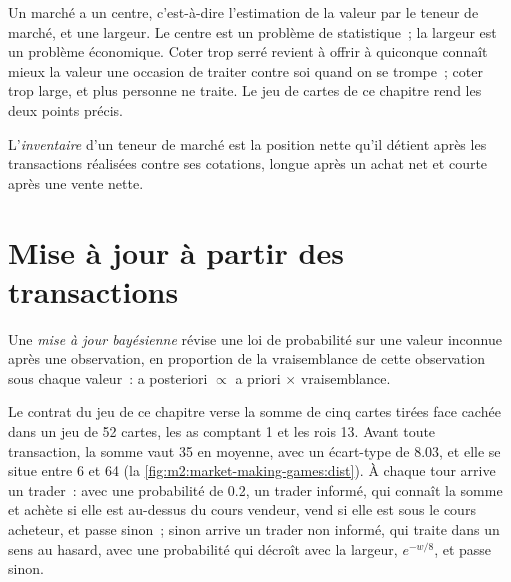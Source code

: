 Un marché a un centre, c'est-à-dire l'estimation de la valeur par le teneur de marché, et une largeur. Le centre est un
problème de statistique~; la largeur est un problème économique. Coter trop serré revient à offrir à quiconque connaît mieux la valeur
une occasion de traiter contre soi quand on se trompe~; coter trop large, et plus personne ne
traite. Le jeu de cartes de ce chapitre rend les deux points précis.

\begin{definition}[Inventaire]\label{def:m2:market-making-games:inv}
L'\emph{inventaire} d'un teneur de marché est la position nette qu'il détient après les
transactions réalisées contre ses cotations, longue après un achat net et courte après une vente nette.
\end{definition}

\section{Mise à jour à partir des transactions}

\begin{definition}\label{def:m2:market-making-games:bayes}
Une \emph{mise à jour bayésienne} révise une loi de probabilité sur une
valeur inconnue après une observation, en proportion de la vraisemblance de cette observation
sous chaque valeur~: a posteriori $\propto$ a priori $\times$ vraisemblance.
\end{definition}

Le contrat du jeu de ce chapitre verse la somme de cinq cartes tirées face cachée dans un
jeu de 52 cartes, les as comptant 1 et les rois 13. Avant toute transaction, la somme vaut 35 en moyenne, avec un
écart-type de 8.03, et elle se situe entre 6 et 64
(la \cref{fig:m2:market-making-games:dist}). À chaque tour arrive un trader~: avec une probabilité
de 0.2, un trader informé, qui connaît la somme et achète si elle est au-dessus du cours vendeur,
vend si elle est sous le cours acheteur, et passe sinon~; sinon arrive un trader non informé, qui traite
dans un sens au hasard, avec une probabilité qui décroît avec la largeur, $e^{-w/8}$, et passe sinon.

